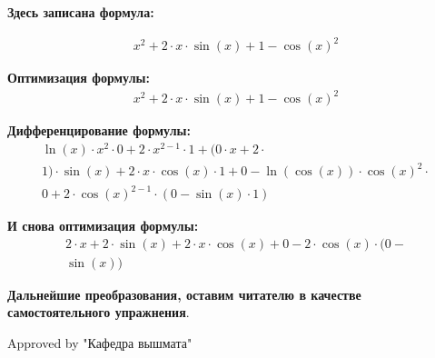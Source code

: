 \documentclass[12pt, a4paper]{article}
\begin{document}
\textbf{Здесь записана формула:}

\begin{equation}
\begin{split}
x ^ 2 + 2 \cdot x \cdot \sin(x) + 1 - \cos(x) ^ 2
\end{split}
\end{equation}

\textbf{Оптимизация формулы:}
\begin{equation}
\begin{split}x ^ 2 + 2 \cdot x \cdot \sin(x) + 1 - \cos(x) ^ 2
\end{split}
\end{equation}

\textbf{Дифференцирование формулы:}
\begin{equation}
\begin{split}\ln(x) \cdot x ^ 2 \cdot 0 + 2 \cdot x ^ {2 - 1} \cdot 1 + (0 \cdot x + 2 \cdot  \\ 
1) \cdot \sin(x) + 2 \cdot x \cdot \cos(x) \cdot 1 + 0 - \ln(\cos(x)) \cdot \cos(x) ^ 2 \cdot  \\ 
0 + 2 \cdot \cos(x) ^ {2 - 1}\cdot (0 - \sin(x) \cdot 1)
\end{split}
\end{equation}

\textbf{И снова оптимизация формулы:}
\begin{equation}
\begin{split}2 \cdot x + 2 \cdot \sin(x) + 2 \cdot x \cdot \cos(x) + 0 - 2 \cdot \cos(x)\cdot (0 -  \\ 
\sin(x))
\end{split}
\end{equation}

\textbf{Дальнейшие преобразования, оставим читателю в качестве самостоятельного упражнения}.

Approved by "Кафедра вышмата"
\end{document}
